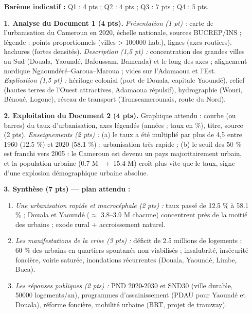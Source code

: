 \documentclass[11pt]{article}
\begin{document}
\begin{corrige}
\textbf{Barème indicatif :} Q1 : 4 pts ; Q2 : 4 pts ; Q3 : 7 pts ; Q4 : 5 pts.

\textbf{1. Analyse du Document 1 (4 pts).} \emph{Présentation (1 pt) :} carte de l'urbanisation du Cameroun en 2020, échelle nationale, sources BUCREP/INS ; légende : points proportionnels (villes > \num{100 000} hab.), lignes (axes routiers), hachures (fortes densités). \emph{Description (1,5 pt) :} concentration des grandes villes au Sud (Douala, Yaoundé, Bafoussam, Bamenda) et le long des axes ; alignement nordique Ngaoundéré–Garoua–Maroua ; vides sur l'Adamaoua et l'Est. \emph{Explication (1,5 pt) :} héritage colonial (port de Douala, capitale Yaoundé), relief (hautes terres de l'Ouest attractives, Adamaoua répulsif), hydrographie (Wouri, Bénoué, Logone), réseau de transport (Transcamerounais, route du Nord).

\textbf{2. Exploitation du Document 2 (4 pts).} Graphique attendu : courbe (ou barres) du taux d'urbanisation, axes légendés (années ; taux en \%), titre, source (2 pts). \emph{Enseignements (2 pts) :} (a) le taux a été multiplié par plus de 4,5 entre 1960 (\num{12,5} \%) et 2020 (\num{58,1} \%) : urbanisation très rapide ; (b) le seuil des \num{50} \% est franchi vers 2005 : le Cameroun est devenu un pays majoritairement urbain, et la population urbaine (\num{0,7} M $\rightarrow$ \num{15,4} M) croît plus vite que le taux, signe d'une explosion démographique urbaine absolue.

\textbf{3. Synthèse (7 pts) — plan attendu :}
\begin{enumerate}
    \item \emph{Une urbanisation rapide et macrocéphale (2 pts) :} taux passé de \num{12,5} \% à \num{58,1} \% ; Douala et Yaoundé ($\approx$ \num{3,8}--\num{3,9} M chacune) concentrent près de la moitié des urbains ; exode rural + accroissement naturel.
    \item \emph{Les manifestations de la crise (3 pts) :} déficit de \num{2,5} millions de logements ; \num{60} \% des urbains en quartiers spontanés non viabilisés ; insalubrité, insécurité foncière, voirie saturée, inondations récurrentes (Douala, Yaoundé, Limbe, Buea).
    \item \emph{Les réponses publiques (2 pts) :} PND 2020-2030 et SND30 (ville durable, \num{50 000} logements/an), programmes d'assainissement (PDAU pour Yaoundé et Douala), réforme foncière, mobilité urbaine (BRT, projet de tramway).
\end{enumerate}


\end{corrige}
\end{document}
